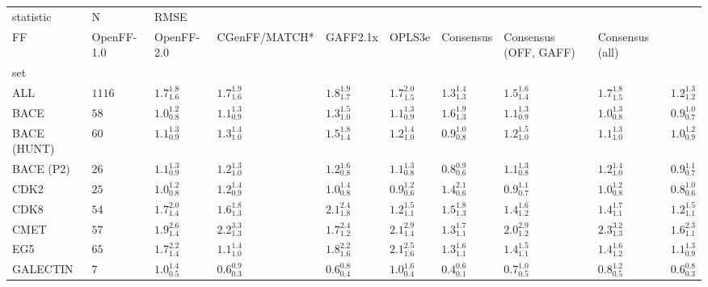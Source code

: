 \begin{tabular}{llllllllll}
\toprule
statistic &       N & \multicolumn{8}{l}{RMSE} \\
FF &         OpenFF-1.0 &         OpenFF-2.0 &      CGenFF/MATCH* &           GAFF2.1x &             OPLS3e &          Consensus & Consensus (OFF, GAFF) &    Consensus (all) \\
set         &         &                    &                    &                    &                    &                    &                    &                       &                    \\
\midrule
ALL         &  $1116$ &  $1.7_{1.6}^{1.8}$ &  $1.7_{1.6}^{1.9}$ &  $1.8_{1.7}^{1.9}$ &  $1.7_{1.5}^{2.0}$ &  $1.3_{1.3}^{1.4}$ &  $1.5_{1.4}^{1.6}$ &     $1.7_{1.5}^{1.8}$ &  $1.2_{1.2}^{1.3}$ \\
BACE        &    $58$ &  $1.0_{0.8}^{1.2}$ &  $1.1_{0.9}^{1.3}$ &  $1.3_{1.0}^{1.5}$ &  $1.1_{0.9}^{1.3}$ &  $1.6_{1.3}^{1.9}$ &  $1.1_{0.9}^{1.3}$ &     $1.0_{0.8}^{1.3}$ &  $0.9_{0.7}^{1.0}$ \\
BACE (HUNT) &    $60$ &  $1.1_{0.9}^{1.3}$ &  $1.3_{1.0}^{1.4}$ &  $1.5_{1.4}^{1.8}$ &  $1.2_{1.0}^{1.4}$ &  $0.9_{0.8}^{1.0}$ &  $1.2_{1.0}^{1.5}$ &     $1.1_{1.0}^{1.3}$ &  $1.0_{0.9}^{1.2}$ \\
BACE (P2)   &    $26$ &  $1.1_{0.9}^{1.3}$ &  $1.2_{1.0}^{1.3}$ &  $1.2_{0.8}^{1.6}$ &  $1.1_{0.8}^{1.3}$ &  $0.8_{0.6}^{0.9}$ &  $1.1_{0.8}^{1.3}$ &     $1.2_{1.0}^{1.4}$ &  $0.9_{0.7}^{1.1}$ \\
CDK2        &    $25$ &  $1.0_{0.8}^{1.2}$ &  $1.2_{0.9}^{1.4}$ &  $1.0_{0.8}^{1.4}$ &  $0.9_{0.6}^{1.2}$ &  $1.4_{0.6}^{2.1}$ &  $0.9_{0.7}^{1.1}$ &     $1.0_{0.8}^{1.2}$ &  $0.8_{0.6}^{1.0}$ \\
CDK8        &    $54$ &  $1.7_{1.4}^{2.0}$ &  $1.6_{1.3}^{1.8}$ &  $2.1_{1.8}^{2.4}$ &  $1.2_{1.1}^{1.5}$ &  $1.5_{1.3}^{1.8}$ &  $1.4_{1.2}^{1.6}$ &     $1.4_{1.1}^{1.7}$ &  $1.2_{1.1}^{1.5}$ \\
CMET        &    $57$ &  $1.9_{1.4}^{2.6}$ &  $2.2_{1.3}^{3.3}$ &  $1.7_{1.2}^{2.4}$ &  $2.1_{1.4}^{2.9}$ &  $1.3_{1.1}^{1.7}$ &  $2.0_{1.2}^{2.9}$ &     $2.3_{1.3}^{3.2}$ &  $1.6_{1.1}^{2.3}$ \\
EG5         &    $65$ &  $1.7_{1.4}^{2.2}$ &  $1.1_{1.0}^{1.4}$ &  $1.8_{1.6}^{2.2}$ &  $2.1_{1.6}^{2.5}$ &  $1.3_{1.1}^{1.6}$ &  $1.4_{1.1}^{1.5}$ &     $1.4_{1.2}^{1.6}$ &  $1.1_{0.9}^{1.3}$ \\
GALECTIN    &     $7$ &  $1.0_{0.5}^{1.4}$ &  $0.6_{0.3}^{0.9}$ &  $0.6_{0.4}^{0.8}$ &  $1.0_{0.4}^{1.6}$ &  $0.4_{0.1}^{0.6}$ &  $0.7_{0.5}^{1.0}$ &     $0.8_{0.5}^{1.2}$ &  $0.6_{0.3}^{0.8}$ \\

\end{tabular}
